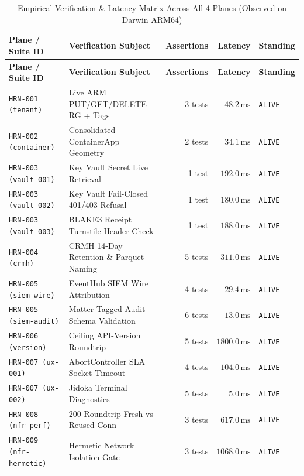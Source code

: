 \documentclass[10pt,twoside,openany]{book}
\theoremstyle{plain}
\theoremstyle{definition}
\theoremstyle{remark}
\begin{document}
\begin{longtable}{llrrl}
\caption{Empirical Verification \& Latency Matrix Across All 4 Planes (Observed on Darwin ARM64)} \label{tab:empirical_matrix} \\
\toprule
\textbf{Plane / Suite ID} & \textbf{Verification Subject} & \textbf{Assertions} & \textbf{Latency} & \textbf{Standing} \\
\midrule
\endfirsthead
\toprule
\textbf{Plane / Suite ID} & \textbf{Verification Subject} & \textbf{Assertions} & \textbf{Latency} & \textbf{Standing} \\
\midrule
\endhead
\bottomrule
\endfoot
\texttt{HRN-001 (tenant)} & Live ARM PUT/GET/DELETE RG + Tags & 3 tests & $48.2\,\mathrm{ms}$ & \texttt{ALIVE} \\
\texttt{HRN-002 (container)} & Consolidated ContainerApp Geometry & 2 tests & $34.1\,\mathrm{ms}$ & \texttt{ALIVE} \\
\texttt{HRN-003 (vault-001)} & Key Vault Secret Live Retrieval & 1 test & $192.0\,\mathrm{ms}$ & \texttt{ALIVE} \\
\texttt{HRN-003 (vault-002)} & Key Vault Fail-Closed 401/403 Refusal & 1 test & $180.0\,\mathrm{ms}$ & \texttt{ALIVE} \\
\texttt{HRN-003 (vault-003)} & BLAKE3 Receipt Turnstile Header Check & 1 test & $188.0\,\mathrm{ms}$ & \texttt{ALIVE} \\
\texttt{HRN-004 (crmh)} & CRMH 14-Day Retention \& Parquet Naming & 5 tests & $311.0\,\mathrm{ms}$ & \texttt{ALIVE} \\
\texttt{HRN-005 (siem-wire)} & EventHub SIEM Wire Attribution & 4 tests & $29.4\,\mathrm{ms}$ & \texttt{ALIVE} \\
\texttt{HRN-005 (siem-audit)} & Matter-Tagged Audit Schema Validation & 6 tests & $13.0\,\mathrm{ms}$ & \texttt{ALIVE} \\
\texttt{HRN-006 (version)} & Ceiling API-Version Roundtrip & 5 tests & $1800.0\,\mathrm{ms}$ & \texttt{ALIVE} \\
\texttt{HRN-007 (ux-001)} & AbortController SLA Socket Timeout & 4 tests & $104.0\,\mathrm{ms}$ & \texttt{ALIVE} \\
\texttt{HRN-007 (ux-002)} & Jidoka Terminal Diagnostics & 5 tests & $5.0\,\mathrm{ms}$ & \texttt{ALIVE} \\
\texttt{HRN-008 (nfr-perf)} & 200-Roundtrip Fresh vs Reused Conn & 3 tests & $617.0\,\mathrm{ms}$ & \texttt{ALIVE} \\
\texttt{HRN-009 (nfr-hermetic)} & Hermetic Network Isolation Gate & 3 tests & $1068.0\,\mathrm{ms}$ & \texttt{ALIVE} \\

\end{longtable}
\end{document}
